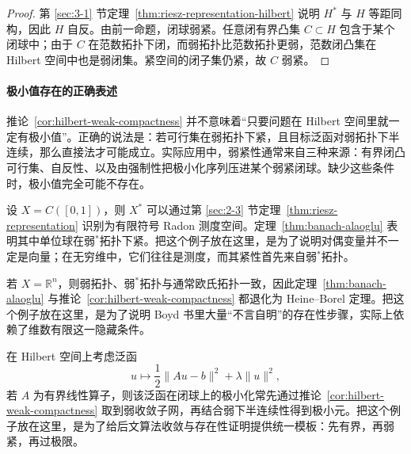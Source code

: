 \begin{proof}
第 \ref{sec:3-1} 节定理~\ref{thm:riesz-representation-hilbert} 说明 $H^\ast$ 与 $H$ 等距同构，因此 $H$ 自反。由前一命题，闭球弱紧。任意闭有界凸集 $C\subset H$ 包含于某个闭球中；由于 $C$ 在范数拓扑下闭，而弱拓扑比范数拓扑更弱，范数闭凸集在 Hilbert 空间中也是弱闭集。紧空间的闭子集仍紧，故 $C$ 弱紧。
\end{proof}

\paragraph{极小值存在的正确表述}

\begin{remark}
推论~\ref{cor:hilbert-weak-compactness} 并不意味着“只要问题在 Hilbert 空间里就一定有极小值”。正确的说法是：若可行集在弱拓扑下紧，且目标泛函对弱拓扑下半连续，那么直接法才可能成立。实际应用中，弱紧性通常来自三种来源：有界闭凸可行集、自反性、以及由强制性把极小化序列压进某个弱紧闭球。缺少这些条件时，极小值完全可能不存在。
\end{remark}

\begin{example}\label{ex:dual-ball-weak-star}
设 $X=C([0,1])$，则 $X^\ast$ 可以通过第 \ref{sec:2-3} 节定理~\ref{thm:riesz-representation} 识别为有限符号 Radon 测度空间。定理~\ref{thm:banach-alaoglu} 表明其中单位球在弱$^\ast$拓扑下紧。把这个例子放在这里，是为了说明对偶变量并不一定是向量；在无穷维中，它们往往是测度，而其紧性首先来自弱$^\ast$拓扑。
\end{example}

\begin{example}\label{ex:finite-dimensional-compactness}
若 $X=\mathbb R^n$，则弱拓扑、弱$^\ast$拓扑与通常欧氏拓扑一致，因此定理~\ref{thm:banach-alaoglu} 与推论~\ref{cor:hilbert-weak-compactness} 都退化为 Heine--Borel 定理。把这个例子放在这里，是为了说明 Boyd 书里大量“不言自明”的存在性步骤，实际上依赖了维数有限这一隐藏条件。
\end{example}

\begin{example}\label{ex:weak-direct-method}
在 Hilbert 空间上考虑泛函
\[
u\mapsto \frac12\|Au-b\|^2+\lambda \|u\|^2,
\]
若 $A$ 为有界线性算子，则该泛函在闭球上的极小化常先通过推论~\ref{cor:hilbert-weak-compactness} 取到弱收敛子网，再结合弱下半连续性得到极小元。把这个例子放在这里，是为了给后文算法收敛与存在性证明提供统一模板：先有界，再弱紧，再过极限。
\end{example}

